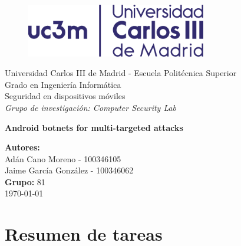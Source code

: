 \documentclass[a4paper,11pt]{report}
\begin{document}
\begin{titlepage}

\begin{center}
\vspace*{0.5in}
\begin{figure}[htb]
\begin{center}
\includegraphics[width=0.7\textwidth]{uc3m}
\end{center}
\end{figure}
\vspace*{1in}
Universidad Carlos III de Madrid - Escuela Politécnica Superior \\
Grado en Ingeniería Informática \\
Seguridad en dispositivos móviles \\

\vspace*{0.1in}
\emph{Grupo de investigación: Computer Security Lab}  \\

\vspace*{1.2in}
\begin{huge}
\textbf{Android botnets for multi-targeted attacks} \\
\end{huge}


\end{center}

\vfill
\begin{center}
\textbf{Autores:}\\
Adán Cano Moreno - 100346105\\
Jaime García González - 100346062\\
\vspace*{0.2in}
\textbf{Grupo:} 81\\
\vspace*{1in}
\today
\end{center}


\end{titlepage}


\tableofcontents
\thispagestyle{empty}
\chapter{Resumen de tareas}
\renewcommand{\thepage}{\arabic{page}}
\setcounter{page}{1}
\pagestyle{fancy}
\end{document}
